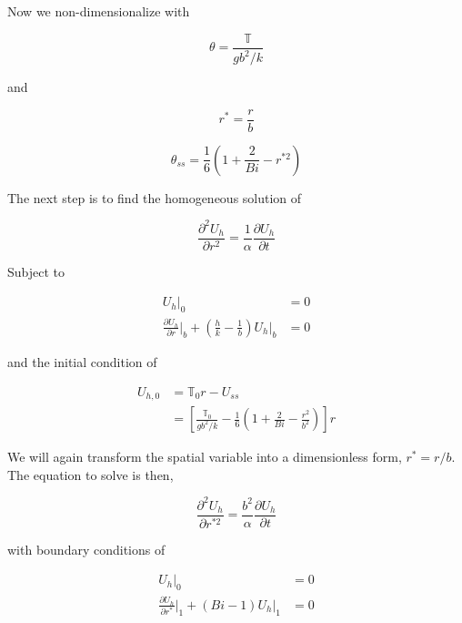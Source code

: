 Now we non-dimensionalize with 

\begin{equation}\label{eq:dimensionless-temp-definition}
    \theta = \frac{\mathbb{T}}{gb^2/k}
\end{equation}

and

\begin{equation}
    r^* = \frac{r}{b}
\end{equation}


\begin{equation}
    \theta_{ss} = \frac{1}{6} \left( 1 + \frac{2}{Bi} - r^{*2} \right)
\end{equation}

The next step is to find the homogeneous solution of 

\begin{equation}
    \frac{\partial^2 U_h}{\partial r^2} = \frac{1}{\alpha}\frac{\partial U_h}{\partial t}
\end{equation}

Subject to 

\begin{align}
    U_{h}\big|_0 &= 0\\
    \frac{\partial U_{h}}{\partial r}\big|_b + \left(\frac{h}{k} - \frac{1}{b}\right)U_{h}\big|_b &= 0
\end{align}

and the initial condition of

\begin{align}
    U_{h,0} &= \mathbb{T}_0r - U_{ss}\\
    & = \left[\frac{\mathbb{T}_0}{gb^2/k} - \frac{1}{6}\left(1 + \frac{2}{Bi} - \frac{r^2}{b^2}\right)\right]r
\end{align}

We will again transform the spatial variable into a dimensionless form, $r^* = r/b$. The equation to solve is then,

\begin{equation}
    \frac{\partial^2 U_h}{\partial r^{*2}} = \frac{b^2}{\alpha}\frac{\partial U_h}{\partial t}
\end{equation}

with boundary conditions of

\begin{align}
    U_{h}\big|_0 &= 0\\
    \frac{\partial U_{h}}{\partial r^*}\big|_1 + (Bi - 1)U_{h}\big|_1 &= 0
\end{align}


